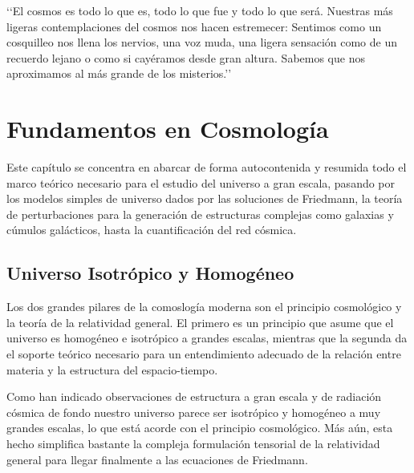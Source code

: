 \begin{savequote}[50mm]
‘‘El cosmos es todo lo que es, todo lo que fue y todo lo que será. Nuestras 
más ligeras contemplaciones del cosmos nos hacen estremecer: Sentimos como 
un cosquilleo nos llena los nervios, una voz muda, una ligera sensación como
de un recuerdo lejano o como si cayéramos desde gran altura. Sabemos que nos
aproximamos al más grande de los misterios.’’
\end{savequote}




\chapter{Fundamentos en Cosmología}
\label{cha:Theoretical Framework}


Este capítulo se concentra en abarcar de forma autocontenida y resumida 
todo el marco teórico necesario para el estudio del universo a gran escala,
pasando por los modelos simples de universo dados por las soluciones de 
Friedmann, la teoría de perturbaciones para la generación de estructuras
complejas como galaxias y cúmulos galácticos, hasta la cuantificación del 
red cósmica.




\section{Universo Isotrópico y Homogéneo}
\label{sec:IsotropicAndHomogeneousUniverse}


Los dos grandes pilares de la comoslogía moderna son el principio 
cosmológico y la teoría de la relatividad general. El primero es un 
principio que asume que el universo es homogéneo e isotrópico a grandes 
escalas, mientras que la segunda da el soporte teórico necesario para un 
entendimiento adecuado de la relación entre materia y la estructura del 
espacio-tiempo.


Como han indicado observaciones de estructura a gran escala y de radiación
cósmica de fondo nuestro universo parece ser isotrópico y homogéneo a muy
grandes escalas, lo que está acorde con el principio cosmológico. Más aún, 
esta hecho simplifica bastante la compleja formulación tensorial de la 
relatividad general para llegar finalmente a las ecuaciones de Friedmann.


